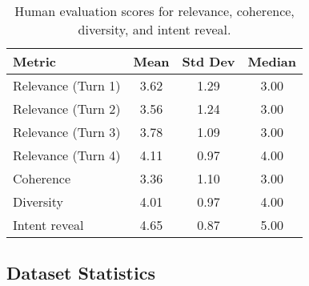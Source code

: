 \documentclass[11pt]{article}
\begin{document}
\begin{table}[!t]
    \centering
    \small
       \setlength{\tabcolsep}{4pt}
    \begin{tabular}{lccc}
        \toprule
        \textbf{Metric} & \textbf{Mean} & \textbf{Std Dev} & \textbf{Median} \\
        \midrule
        Relevance (Turn 1) & 3.62 & 1.29 & 3.00 \\
        Relevance (Turn 2) & 3.56 & 1.24 & 3.00 \\
        Relevance (Turn 3) & 3.78 & 1.09 & 3.00 \\
        Relevance (Turn 4) & 4.11 & 0.97 & 4.00 \\
        Coherence          & 3.36 & 1.10 & 3.00 \\
        Diversity          & 4.01 & 0.97 & 4.00 \\
        Intent reveal & 4.65 & 0.87 & 5.00 \\
        \bottomrule
    \end{tabular}
    \caption{Human evaluation scores for relevance, coherence, diversity, and intent reveal.}
    \label{tab:data_quality}
\end{table}

\subsection{Dataset Statistics}
\end{document}
